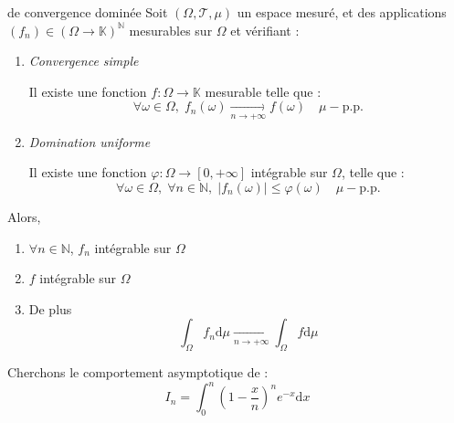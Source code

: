 \begin{Theorem}{
    \color{red} de convergence dominée
  }{}
  Soit $(\Omega, \mathcal{T}, \mu)$ un espace mesuré, et des applications $(f_n) \in (\Omega \to \mathbb{K}) ^{\mathbb{N}}$ mesurables sur $\Omega$ et vérifiant : 
  \begin{enumerate}

      \item \textit{Convergence simple} 

        Il existe une fonction $f: \Omega \to \mathbb{K}$ mesurable telle que : 
        \begin{equation}
          \forall \omega \in \Omega, \; f_n(\omega)  \underset{n \to + \infty}{\longrightarrow} f(\omega) \quad \mu-\text{p.p.}
        \end{equation}

      \item \textit{Domination uniforme} 

        Il existe une fonction $\varphi : \Omega \to [0, + \infty]$ intégrable sur $\Omega$, telle que :
        \begin{equation}
          \forall \omega \in \Omega, \; \forall n \in \mathbb{N},\;  |f_n(\omega) | \le \varphi(\omega) \quad \mu-\text{p.p.}
        \end{equation}
  \end{enumerate}

  Alors, 
  \begin{enumerate}

      \item $\forall n \in \mathbb{N}$, $f_n$ intégrable sur $\Omega$ 
      \item $f$ intégrable sur $\Omega$ 
      \item De plus 
        \begin{equation}
          \int_{\Omega}^{} f_n \mathrm{d}\mu  \underset{n \to + \infty}{\longrightarrow} \int_{\Omega}^{} f \mathrm{d}\mu
        \end{equation}

  \end{enumerate}

\end{Theorem}

\begin{Example}{}{}
Cherchons le comportement asymptotique de :
\begin{equation}
  I _ n = \int_{0}^{n} \left( 1-  \frac{x}{n} \right) ^{n} e ^{-x} \mathrm{d}x
\end{equation}
\end{Example}

